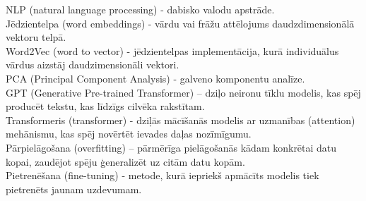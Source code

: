 NLP (natural language processing) - dabisko valodu apstrāde.\\
Jēdzientelpa (word embeddings) - vārdu vai frāžu attēlojums daudzdimensionālā vektoru telpā.\\
Word2Vec (word to vector) - jēdzientelpas implementācija, kurā individuālus vārdus aizstāj daudzimensionāli vektori.\\
PCA (Principal Component Analysis) - galveno komponentu analīze.\\
GPT (Generative Pre-trained Transformer) – dziļo neironu tīklu modelis, kas spēj producēt tekstu, kas līdzīgs cilvēka rakstītam.\\
Transformeris (transformer) - dziļās mācīšanās modelis ar uzmanības (attention) mehānismu, kas spēj novērtēt ievades daļas nozīmīgumu.\\
Pārpielāgošana (overfitting) – pārmērīga pielāgošanās kādam konkrētai datu kopai, zaudējot spēju ģeneralizēt uz citām datu kopām.\\
Pietrenēšana (fine-tuning) - metode, kurā iepriekš apmācīts modelis tiek pietrenēts jaunam uzdevumam.